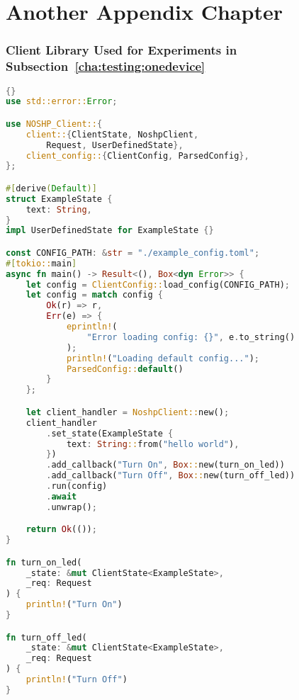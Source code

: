
\chapter{Another Appendix Chapter}
\label{chap:A2}

\subsection{Client Library Used for Experiments in Subsection~\ref{cha:testing:onedevice}} \label{chap:A2:onedeviceclientlib}
\begin{lstlisting}[language=Rust, style=boxed, showstringspaces=false]{}
use std::error::Error;

use NOSHP_Client::{
    client::{ClientState, NoshpClient, 
        Request, UserDefinedState},
    client_config::{ClientConfig, ParsedConfig},
};

#[derive(Default)]
struct ExampleState {
    text: String,
}
impl UserDefinedState for ExampleState {}

const CONFIG_PATH: &str = "./example_config.toml";
#[tokio::main]
async fn main() -> Result<(), Box<dyn Error>> {
    let config = ClientConfig::load_config(CONFIG_PATH);
    let config = match config {
        Ok(r) => r,
        Err(e) => {
            eprintln!(
                "Error loading config: {}", e.to_string()
            );
            println!("Loading default config...");
            ParsedConfig::default()
        }
    };

    let client_handler = NoshpClient::new();
    client_handler
        .set_state(ExampleState {
            text: String::from("hello world"),
        })
        .add_callback("Turn On", Box::new(turn_on_led))
        .add_callback("Turn Off", Box::new(turn_off_led))
        .run(config)
        .await
        .unwrap();

    return Ok(());
}

fn turn_on_led(
    _state: &mut ClientState<ExampleState>,
    _req: Request
) {
    println!("Turn On")
}

fn turn_off_led(
    _state: &mut ClientState<ExampleState>,
    _req: Request
) {
    println!("Turn Off")
}
\end{lstlisting}
